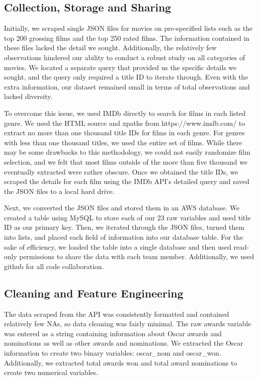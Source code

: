 \documentclass[10pt]{article}
\begin{document}
\subsection{Collection, Storage and Sharing}

Initially, we scraped single JSON files for movies on pre-specified lists such as the top 200 grossing films and the top 250 rated films. The information contained in these files lacked the detail we sought. Additionally, the relatively few observations hindered our ability to conduct a robust study on all categories of movies. We located a separate query that provided us the specific details we sought, and the query only required a title ID to iterate through. Even with the extra information, our dataset remained small in terms of total observations and lacked diversity. 

To overcome this issue, we used IMDb directly to search for films in each listed genre. We used the HTML source and xpaths from https://www.imdb.com/ to extract no more than one thousand title IDs for films in each genre. For genres with less than one thousand titles, we used the entire set of films. While there may be some drawbacks to this methodology, we could not easily randomize film selection, and we felt that most films outside of the more than five thousand we eventually extracted were rather obscure. Once we obtained the title IDs, we scraped the details for each film using the IMDb API’s detailed query and saved the JSON files to a local hard drive. 

Next, we converted the JSON files and stored them in an AWS database. We created a table using MySQL to store each of our 23 raw variables and used title ID as our primary key. Then, we iterated through the JSON files, turned them into lists, and placed each field of information into our database table. For the sake of efficiency, we loaded the table into a single database and then used read-only permissions to share the data with each team member. Additionally, we used github for all code collaboration.


\subsection{Cleaning and Feature Engineering}

The data scraped from the API was consistently formatted and contained relatively few NAs, so data cleaning was fairly minimal. The raw awards variable was entered as a string containing information about Oscar awards and nominations as well as other awards and nominations. We extracted the Oscar information to create two binary variables: oscar\_nom and oscar\_won. Additionally, we extracted total awards won and total award nominations to create two numerical variables. 
\end{document}
